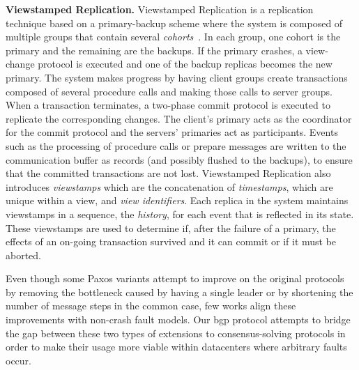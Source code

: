 \textbf{Viewstamped Replication.} Viewstamped Replication is a replication technique based on a primary-backup scheme where the system is composed of multiple groups that contain several \textit{cohorts}~\cite{Oki:1988}. In each group, one cohort is the primary and the remaining are the backups. If the primary crashes, a view-change protocol is executed and one of the backup replicas becomes the new primary. The system makes progress by having client groups create transactions composed of several procedure calls and making those calls to server groups. When a transaction terminates, a two-phase commit protocol is executed to replicate the corresponding changes. The client's primary acts as the coordinator for the commit protocol and the servers' primaries act as participants. Events such as the processing of procedure calls or prepare messages are written to the communication buffer as records (and possibly flushed to the backups), to ensure that the committed transactions are not lost. Viewstamped Replication also introduces \textit{viewstamps} which are the concatenation of \textit{timestamps}, which are unique within a view, and \textit{view identifiers}. Each replica in the system maintains viewstamps in a sequence, the \textit{history}, for each event that is reflected in its state. These viewstamps are used to determine if, after the failure of a primary, the effects of an on-going transaction survived and it can commit or if it must be aborted. \par
Even though some Paxos variants attempt to improve on the original protocols by removing the bottleneck caused by having a single leader or by shortening the number of message steps in the common case, few works align these improvements with non-crash fault models. Our \acrlong{bgp} protocol attempts to bridge the gap between these two types of extensions to consensus-solving protocols in order to make their usage more viable within datacenters where arbitrary faults occur.

